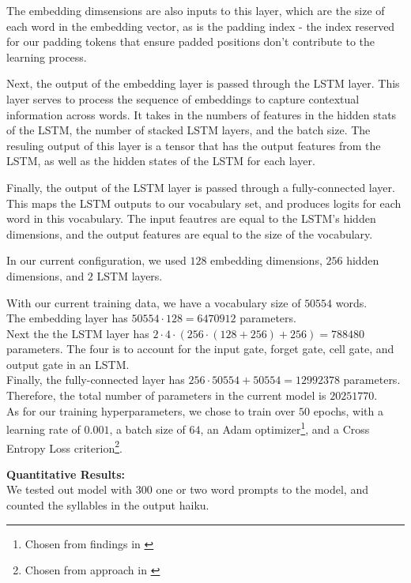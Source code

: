 \documentclass{article} %
\begin{document}
The embedding dimsensions are also inputs to this layer, which are the size
of each word in the embedding vector, as is the padding index - the index reserved
for our padding tokens that ensure padded positions don't contribute to the learning process.

Next, the output of the embedding layer is passed through the LSTM layer.
This layer serves to process the sequence of embeddings to capture
contextual information across words.
It takes in the numbers of features in the hidden stats of the LSTM, the number of stacked
LSTM layers, and the batch size.
The resuling output of this layer is a tensor that has the output features from the LSTM,
as well as the hidden states of the LSTM for each layer.

Finally, the output of the LSTM layer is passed through a fully-connected layer.
This maps the LSTM outputs to our vocabulary set, and produces logits for each word in this vocabulary.
The input feautres are equal to the LSTM's hidden dimensions, and the output features are equal to the size of the vocabulary.

In our current configuration, we used $128$ embedding dimensions, $256$ hidden dimensions, and $2$ LSTM layers.

With our current training data, we have a vocabulary size of $50554$ words. \\
The embedding layer has $50554 \cdot 128 = 6470912$ parameters. \\
Next the the LSTM layer has $2 \cdot 4 \cdot (256 \cdot (128 + 256) + 256) = 788480$ parameters. The four is to account for the input gate, forget gate, cell gate, and output gate in an LSTM. \\
Finally, the fully-connected layer has $256 \cdot 50554 + 50554 = 12992378$ parameters. \\

Therefore, the total number of parameters in the current model is $20251770$. \\

As for our training hyperparameters, we chose to train over $50$ epochs, with a learning rate of $0.001$, a batch size of $64$, an Adam optimizer\footnote{Chosen from findings in \citep{kingma2017adammethodstochasticoptimization}}, and a Cross Entropy Loss criterion\footnote{Chosen from approach in \citep{tensorflow_text_generation}}.

\textbf{Quantitative Results:} \\
We tested out model with 300 one or two word prompts to the model, and counted the syllables in the output haiku.
\end{document}
